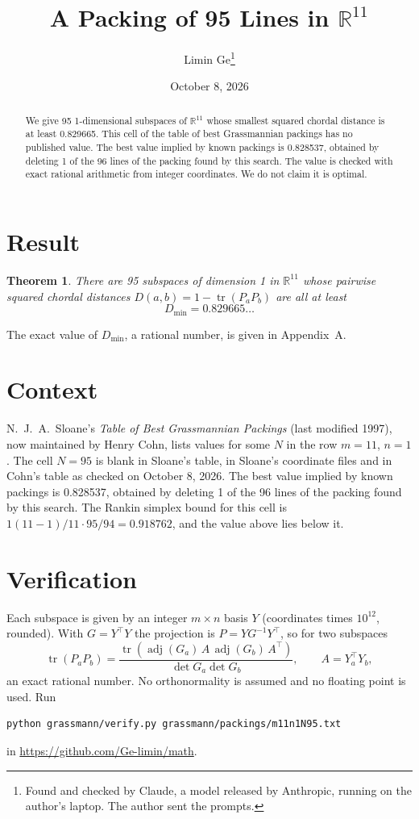 \documentclass[11pt,a4paper]{article}
\title{A Packing of 95 Lines in $\mathbb{R}^{11}$}
\author{Limin Ge\thanks{Found and checked by Claude, a model released by Anthropic, running on the author's laptop. The author sent the prompts.}}
\date{October 8, 2026}
\newtheorem*{theorem}{Theorem}
\begin{document}
\maketitle
\begin{abstract}
We give 95 1-dimensional subspaces of $\mathbb{R}^{11}$ whose smallest squared chordal distance is at least 0.829665. This cell of the table of best Grassmannian packings has no published value. The best value implied by known packings is 0.828537, obtained by deleting 1 of the 96 lines of the packing found by this search. The value is checked with exact rational arithmetic from integer coordinates. We do not claim it is optimal.
\end{abstract}

\section{Result}
\begin{theorem}
There are 95 subspaces of dimension 1 in $\mathbb{R}^{11}$ whose pairwise squared chordal distances $D(a,b) = 1 - \operatorname{tr}(P_aP_b)$ are all at least
\[ D_{\min} = 0.829665\ldots \]
\end{theorem}
The exact value of $D_{\min}$, a rational number, is given in Appendix~A.


\section{Context}
N.~J.~A.~Sloane's \emph{Table of Best Grassmannian Packings} (last modified 1997), now maintained by Henry Cohn, lists values for some $N$ in the row $m=11$, $n=1$. The cell $N=95$ is blank in Sloane's table, in Sloane's coordinate files and in Cohn's table as checked on October 8, 2026. The best value implied by known packings is 0.828537, obtained by deleting 1 of the 96 lines of the packing found by this search. The Rankin simplex bound for this cell is $1(11-1)/11\cdot 95/94 = 0.918762$, and the value above lies below it.


\section{Verification}
Each subspace is given by an integer $m\times n$ basis $Y$ (coordinates times $10^{12}$, rounded). With $G=Y^\top Y$ the projection is $P=YG^{-1}Y^\top$, so for two subspaces
\[ \operatorname{tr}(P_aP_b)=\frac{\operatorname{tr}(\operatorname{adj}(G_a)\,A\,\operatorname{adj}(G_b)\,A^\top)}{\det G_a\det G_b},\qquad A=Y_a^\top Y_b, \]
an exact rational number. No orthonormality is assumed and no floating point is used. Run
\begin{verbatim}
python grassmann/verify.py grassmann/packings/m11n1N95.txt
\end{verbatim}
in \url{https://github.com/Ge-limin/math}.
\end{document}
